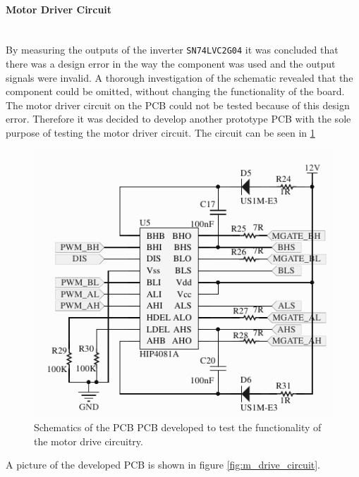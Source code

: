 \paragraph{Motor Driver Circuit}~\\
By measuring the outputs of the inverter \texttt{SN74LVC2G04} it was concluded that there was a design error in the way the component was used and the output signals were invalid.
A thorough investigation of the schematic revealed that the component could be omitted, without changing the functionality of the board.
The motor driver circuit on the PCB could not be tested because of this design error.
Therefore it was decided to develop another prototype PCB with the sole purpose of testing the motor driver circuit.
The circuit can be seen in \ref{fig:m_drive_circuit_schem}
\begin{figure}
	\centering
	\includegraphics[width=0.6\linewidth]{graphics/hip_testboard_prototype}
	\caption[Prototype PCB with motor driver schematics]{Schematics of the PCB PCB developed to test the functionality of the motor drive circuitry.}
	\label{fig:m_drive_circuit_schem}
\end{figure}

A picture of the developed PCB is shown in figure \ref{fig:m_drive_circuit}.

